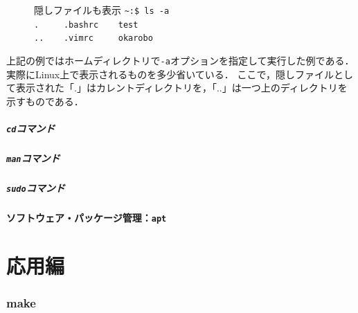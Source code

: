 \documentclass[autodetect-engine,dvi=dvipdfmx,ja=standard,a4j]{bxjsarticle}
\newcommand{\cmd}[1]{\textcolor{yellow!70!white} {#1}}
\newcommand{\dirpath}[1]{\textcolor{Cerulean}{#1}}
\newcommand{\prompt}[1]{\texttt{\dirpath{#1}:\$ }}
\newcommand{\termtext}[2]{\Large{\prompt{#1}\texttt{#2}}}
\begin{document}
\begin{figure}[H]
    \begin{terminal}{隠しファイルも表示}
        \termtext{\textasciitilde}{\cmd{ls} -a} \\
        \texttt{\textcolor{dircolor}{.} \ \ \ \ .bashrc \ \ \ \textcolor{dircolor}{test}} \\
        \texttt{\textcolor{dircolor}{..} \ \ \ .vimrc \ \ \ \ \textcolor{dircolor}{okarobo}} 
    \end{terminal}
\end{figure}

上記の例ではホームディレクトリで\verb|-a|オプションを指定して実行した例である．
実際にLinux上で表示されるものを多少省いている．
ここで，隠しファイルとして表示された「.」はカレントディレクトリを，「..」は一つ上のディレクトリを示すものである．

\subsubsection{\texttt{cd}コマンド}


\subsubsection{\texttt{man}コマンド} \label{sec:cmd_man}

\subsubsection{\texttt{sudo}コマンド}

\subsection{ソフトウェア・パッケージ管理：\texttt{apt}}

\clearpage
\part{応用編}

\section{make}
\end{document}
